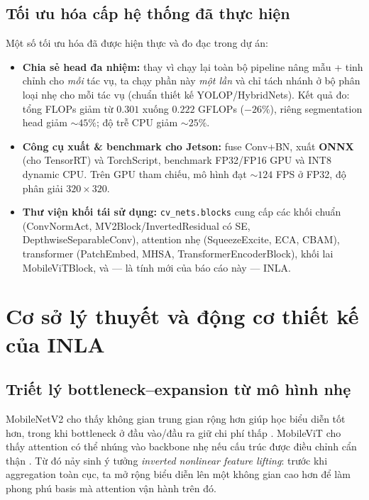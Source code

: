 \documentclass[12pt,a4paper]{article}
\begin{document}
\subsection{Tối ưu hóa cấp hệ thống đã thực hiện}
Một số tối ưu hóa đã được hiện thực và đo đạc trong dự án:
\begin{itemize}
    \item \textbf{Chia sẻ head đa nhiệm:} thay vì chạy lại toàn bộ pipeline nâng mẫu + tinh chỉnh
    cho \emph{mỗi} tác vụ, ta chạy phần này \emph{một lần} và chỉ tách nhánh ở bộ phân loại nhẹ cho
    mỗi tác vụ (chuẩn thiết kế YOLOP/HybridNets). Kết quả đo: tổng FLOPs giảm từ $0.301$ xuống
    $0.222$ GFLOPs ($-26\%$), riêng segmentation head giảm $\sim 45\%$; độ trễ CPU giảm $\sim 25\%$.
    \item \textbf{Công cụ xuất \& benchmark cho Jetson:} fuse Conv+BN, xuất \textbf{ONNX} (cho
    TensorRT) và TorchScript, benchmark FP32/FP16 GPU và INT8 dynamic CPU. Trên GPU tham chiếu, mô
    hình đạt $\sim 124$ FPS ở FP32, độ phân giải $320\times 320$.
    \item \textbf{Thư viện khối tái sử dụng:} \texttt{cv\_nets.blocks} cung cấp các khối chuẩn
    (ConvNormAct, MV2Block/InvertedResidual có SE, DepthwiseSeparableConv), attention nhẹ
    (SqueezeExcite, ECA, CBAM), transformer (PatchEmbed, MHSA, TransformerEncoderBlock), khối lai
    MobileViTBlock, và --- là tính mới của báo cáo này --- INLA.
\end{itemize}

\section{Cơ sở lý thuyết và động cơ thiết kế của INLA}
\label{sec:theory}

\subsection{Triết lý bottleneck--expansion từ mô hình nhẹ}
MobileNetV2 cho thấy không gian trung gian rộng hơn giúp học biểu diễn tốt hơn, trong khi bottleneck
ở đầu vào/đầu ra giữ chi phí thấp \cite{mobilenetv2}. MobileViT cho thấy attention có thể nhúng vào
backbone nhẹ nếu cấu trúc được điều chỉnh cẩn thận \cite{mobilevitv1, mobilevitv2}. Từ đó nảy sinh
ý tưởng \emph{inverted nonlinear feature lifting}: trước khi aggregation toàn cục, ta mở rộng biểu
diễn lên một không gian cao hơn để làm phong phú basis mà attention vận hành trên đó.
\end{document}

